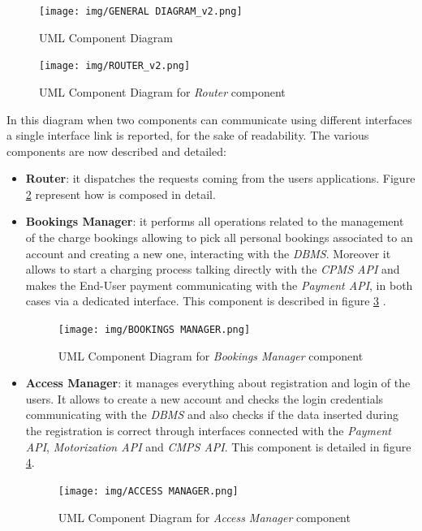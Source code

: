 \documentclass[a4paper]{report}
\begin{document}
\begin{figure}[hp]
\centering
\texttt{[image: img/GENERAL DIAGRAM\_v2.png]}
\caption{UML Component Diagram}
\label{fig:general-component-diagram}
\end{figure}


\begin{figure}[hp]
\centering
\texttt{[image: img/ROUTER\_v2.png]}
\caption{UML Component Diagram for \textit{Router} component}
\label{fig:router-component}
\end{figure}

In this diagram when two components can communicate using different interfaces a single interface link is
reported, for the sake of readability. The various components are now described and detailed:
\begin{itemize}
\item \textbf{Router}: it dispatches the requests coming from the users applications. Figure \ref{fig:router-component} represent how is composed in detail.

\item \textbf{Bookings Manager}: it performs all operations related to the management of the charge bookings allowing to pick all personal bookings associated to an account and creating a new one,  interacting with the \textit{DBMS}. Moreover it allows to start a charging process talking directly with the \textit{CPMS API} and makes the End-User payment communicating with the \textit{Payment API}, in both cases via a dedicated interface. This component is described in figure \ref{fig:bookingsmgr-component} .


\begin{figure}[htp]
\texttt{[image: img/BOOKINGS MANAGER.png]}
\caption{UML Component Diagram for \textit{Bookings Manager} component}
\label{fig:bookingsmgr-component}
\end{figure}

\item \textbf{Access Manager}: it manages everything about registration and login of the users. It allows to create a new account and checks the login credentials communicating with the \textit{DBMS} and also checks if the data inserted during the registration is correct through interfaces connected with the \textit{Payment API}, \textit{Motorization API} and \textit{CMPS API}. This component is detailed in figure \ref{fig:accessmgr-component}.

\begin{figure}[htp]
\centering
\texttt{[image: img/ACCESS MANAGER.png]}
\caption{UML Component Diagram for \textit{Access Manager} component}
\label{fig:accessmgr-component}
\end{figure}


\end{itemize}
\end{document}
